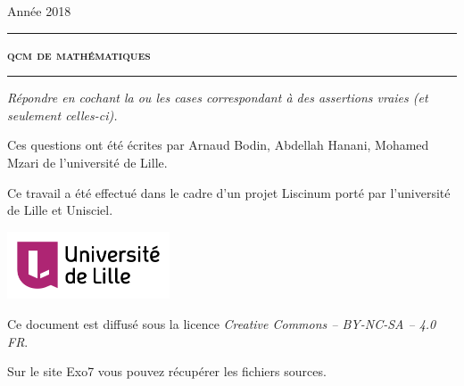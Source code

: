 \documentclass[12pt,a4paper]{article}
\begin{document}
 
 


\hfill{Ann\'ee 2018}

\vspace*{0.5ex}
\hrule\vspace*{1.5ex} 
\hfil\textsc{\textbf{\LARGE qcm de mathématiques}}
\vspace*{1.2ex} \hrule 
\vspace*{5ex} 


\vspace{4cm}

\begin{center}
\begin{minipage}{0.8\textwidth}
\center
\textit{Répondre en cochant la ou les cases correspondant à des assertions vraies (et seulement celles-ci).}
\end{minipage}
\end{center}
  
  


\vfill

\begin{center}
\begin{minipage}{0.8\textwidth}
\center
Ces questions ont été écrites par Arnaud Bodin, Abdellah Hanani, Mohamed Mzari de l'université de Lille.
  
  \medskip
  
Ce travail a été effectué dans le cadre d'un projet Liscinum porté par l'université de Lille et Unisciel.
\end{minipage}

  \medskip

\qquad\qquad
\includegraphics[height=2cm]{ulnom_300}

  \medskip
  
Ce document est diffusé sous la licence \emph{Creative Commons -- BY-NC-SA -- 4.0 FR}.


Sur le site Exo7 vous pouvez récupérer les fichiers sources.

\end{center}
\end{document}
